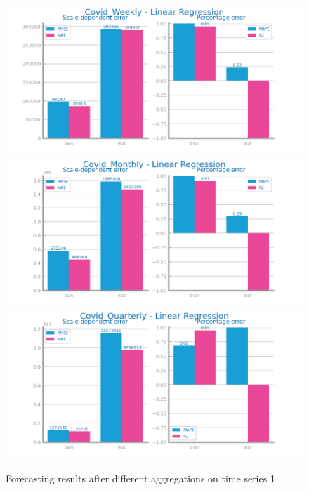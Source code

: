 \documentclass[10pt]{extarticle}
\begin{document}
\begin{figure}[H]
\centering\includegraphics[scale=0.5]{images/dataset1/time_series/Covid_Weekly - Linear Regression_forecasting_eval.png}
\includegraphics[scale=0.5]{images/dataset1/time_series/Covid_Monthly - Linear Regression_forecasting_eval.png}
\includegraphics[scale=0.5]{images/dataset1/time_series/Covid_Quarterly - Linear Regression_forecasting_eval.png}
\caption{Forecasting results after different aggregations on time series 1}
\end{figure}
\end{document}
